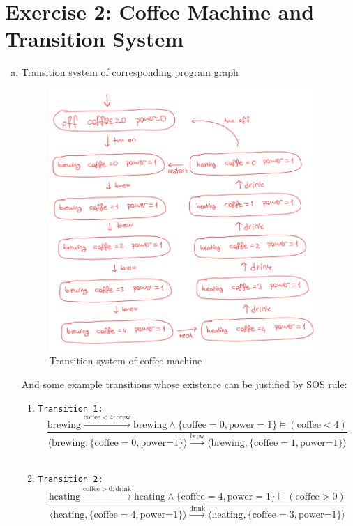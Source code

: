 \documentclass{article}
\begin{document}
\section*{Exercise 2: Coffee Machine and Transition System}
\begin{enumerate}[(a)]
    \item{Transition system of corresponding program graph}
    \begin{figure}[H]
        \centering
        \includegraphics[width=4in]{images/2a.png}
        \caption{Transition system of coffee machine}
        \label{fig:2a}
    \end{figure}
    And some example transitions whose existence can be justified by SOS rule:
    \begin{enumerate}[i]
        \item \texttt{Transition 1:}
        $$\frac{
            \text{brewing}\xrightarrow{\text{coffee}<4:\text{brew}} \text{brewing}  \wedge \{\text{coffee}=0, \text{power}=1\} \models (\text{coffee}<4)
        }{
            \langle \text{brewing}, \{\text{coffee}=0, \text{power=1}\} \rangle 
            \xrightarrow{\text{brew}}
            \langle \text{brewing}, \{\text{coffee}=1, \text{power=1}\} \rangle 
        }$$\\
        
        \item \texttt{Transition 2:}
        $$\frac{
            \text{heating}\xrightarrow{\text{coffee}>0:\text{drink}} \text{heating}  \wedge \{\text{coffee}=4, \text{power}=1\} \models (\text{coffee}>0)
        }{
            \langle \text{heating}, \{\text{coffee}=4, \text{power=1}\} \rangle 
            \xrightarrow{\text{drink}}
            \langle \text{heating}, \{\text{coffee}=3, \text{power=1}\} \rangle 
        }$$\\
        

\end{enumerate}
\end{enumerate}
\end{document}
